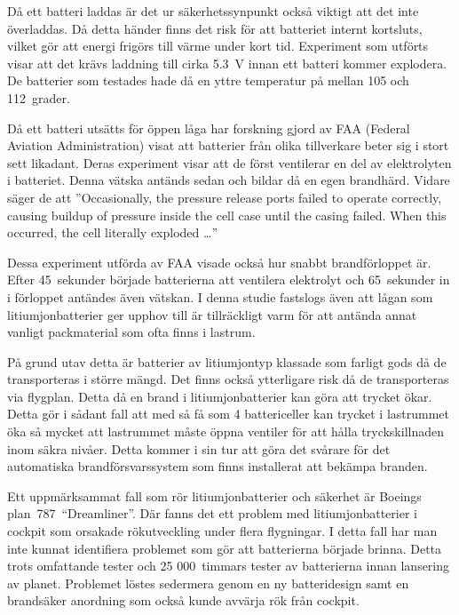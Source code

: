 \documentclass[a4paper,12pt]{article}
\begin{document}
Då ett batteri laddas är det ur säkerhetssynpunkt också viktigt att det inte överladdas. Då detta händer finns det risk för att batteriet internt kortsluts, vilket gör att energi frigörs till värme under kort tid. Experiment som utförts \cite{overcharging} visar att det krävs laddning till cirka 5.3~V innan ett batteri kommer explodera. De batterier som testades hade då en yttre temperatur på mellan 105 och 112~grader.

Då ett batteri utsätts för öppen låga har forskning gjord av FAA (Federal Aviation Administration) \cite{fire-faa} visat att batterier från olika tillverkare beter sig i stort sett likadant. Deras experiment visar att de först ventilerar en del av elektrolyten i batteriet. Denna vätska antänds sedan och bildar då en egen brandhärd. Vidare säger de att ''Occasionally, the pressure release ports failed to operate correctly, causing buildup of pressure inside the cell case until the casing failed. When this occurred, the cell literally exploded …''

Dessa experiment utförda av FAA visade också hur snabbt brandförloppet är. Efter 45~sekunder började batterierna att ventilera elektrolyt och 65~sekunder in i förloppet antändes även vätskan. I denna studie fastslogs även att lågan som litiumjonbatterier ger upphov till är tillräckligt varm för att antända annat vanligt packmaterial som ofta finns i lastrum.\cite{fire-faa}

På grund utav detta är batterier av litiumjontyp klassade som farligt gods då de transporteras i större mängd. Det finns också ytterligare risk då de transporteras via flygplan. Detta då en brand i litiumjonbatterier kan göra att trycket ökar. Detta gör i sådant fall att med så få som 4 battericeller kan trycket i lastrummet öka så mycket att lastrummet måste öppna ventiler för att hålla tryckskillnaden inom säkra nivåer. Detta kommer i sin tur att göra det svårare för det automatiska brandförsvarssystem som finns installerat att bekämpa branden.\cite{fire-faa}

Ett uppmärksammat fall som rör litiumjonbatterier och säkerhet är Boeings plan~787~“Dreamliner”. Där fanns det ett problem med litiumjonbatterier i cockpit som orsakade rökutveckling under flera flygningar. I detta fall har man inte kunnat identifiera problemet som gör att batterierna började brinna. Detta trots omfattande tester och 25 000~timmars tester av batterierna innan lansering av planet. Problemet löstes sedermera genom en ny batteridesign samt en brandsäker anordning som också kunde avvärja rök från cockpit.\cite{dreamliner}
\end{document}
